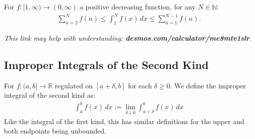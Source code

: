 \documentclass[a4paper, 12pt, twoside]{article}
\begin{document}
For $f : [1, \infty) \to (0, \infty)$ a positive decreasing function,
for any $N \in \mathbb{N}$:
\begin{align*}
      \sum_{n = 2}^N f(n) \leq \int_1^N f(x) \, dx 
      \leq \sum_{n = 1}^{N - 1} f(n).
\end{align*}

\textit{This link may help  with understanding:
\textbf{desmos.com/calculator/me8mtv1slr}}.

\subsection{Improper Integrals of the Second Kind}

For $f:(a, b] \to \mathbb{R}$ regulated on $[a + \delta, b]$ 
for each $\delta \geq 0$. We define the improper integral 
of the second kind as:
\begin{align*}
      \int_a^b f(x) \, dx := 
      \lim_{\delta\downarrow 0} \int_{a + \delta}^b f(x) \, dx
\end{align*}
Like the integral of the first kind, this has similar definitions
for the upper and both endpoints being unbounded.
\end{document}
